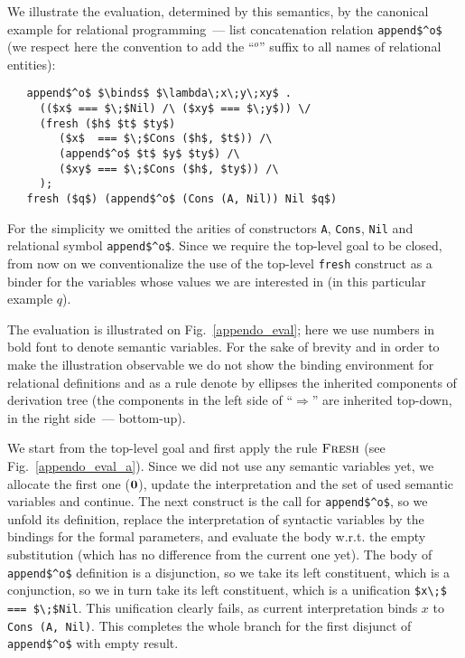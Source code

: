 We illustrate the evaluation, determined by this semantics, by the canonical example for relational programming~--- list concatenation relation \lstinline|append$^o$| 
(we respect here the convention to add the ``$^o$'' suffix to all names of relational entities):

\begin{lstlisting}  
   append$^o$ $\binds$ $\lambda\;x\;y\;xy$ . 
     (($x$ === $\;$Nil) /\ ($xy$ === $\;y$)) \/
     (fresh ($h$ $t$ $ty$)
        ($x$  === $\;$Cons ($h$, $t$)) /\
        (append$^o$ $t$ $y$ $ty$) /\
        ($xy$ === $\;$Cons ($h$, $ty$)) /\
     );
   fresh ($q$) (append$^o$ (Cons (A, Nil)) Nil $q$)
\end{lstlisting}

For the simplicity we omitted the arities of constructors \lstinline|A|, \lstinline|Cons|, \lstinline|Nil| and relational symbol \lstinline|append$^o$|. Since we require the 
top-level goal to be closed, from now on we conventionalize the use of the top-level \lstinline|fresh| construct as a binder for the variables whose values we are 
interested in (in this particular example $q$).

The evaluation is illustrated on Fig.~\ref{appendo_eval}; here we use numbers in bold font to denote semantic variables. For the sake of brevity and in order to
make the illustration observable we do not show the binding environment for relational definitions and as a rule denote by ellipses the inherited components
of derivation tree (the components in the left side of ``$\Rightarrow$'' are inherited top-down, in the right side~--- bottom-up).

\FloatBarrier
We start from the top-level goal and first apply the rule $\textsc{Fresh}$ (see Fig.~\ref{appendo_eval_a}). Since 
we did not use any semantic variables yet, we allocate the first one ($\mbox{\textbf{0}}$), update the interpretation and the set of used semantic variables and continue. The next construct
is the call for \lstinline|append$^o$|, so we unfold its definition, replace the interpretation of syntactic variables by the bindings for the formal parameters, and 
evaluate the body w.r.t. the empty substitution (which has no difference from the current one yet). The body of \lstinline|append$^o$| definition is a disjunction, so we
take its left constituent, which is a conjunction, so we in turn take its left constituent, which is a unification \lstinline|$x\;$ === $\;$Nil|. This unification clearly fails, as
current interpretation binds $x$ to \lstinline|Cons (A, Nil)|. This completes the whole branch for the first disjunct of \lstinline|append$^o$| with empty result.

